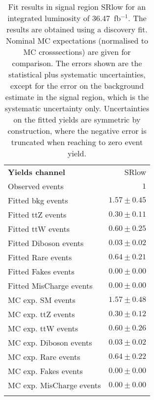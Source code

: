 

\begin{table}
\begin{center}
\setlength{\tabcolsep}{0.0pc}
{\small
\begin{tabular*}{\textwidth}{@{\extracolsep{\fill}}lr}
\noalign{\smallskip}\hline\noalign{\smallskip}
{\bfseries Yields channel}           & SRlow              \\[-0.05cm]
\noalign{\smallskip}\hline\noalign{\smallskip}
Observed events          & $1$                    \\
\noalign{\smallskip}\hline\noalign{\smallskip}
Fitted bkg events         & $1.57 \pm 0.45$              \\
\noalign{\smallskip}\hline\noalign{\smallskip}
        Fitted ttZ events         & $0.30 \pm 0.11$              \\
        Fitted ttW events         & $0.60 \pm 0.25$              \\
        Fitted Diboson events         & $0.03 \pm 0.02$              \\
        Fitted Rare events         & $0.64 \pm 0.21$              \\
        Fitted Fakes events         & $0.00 \pm 0.00$              \\
        Fitted MisCharge events         & $0.00 \pm 0.00$              \\
 \noalign{\smallskip}\hline\noalign{\smallskip}
MC exp. SM events              & $1.57 \pm 0.48$              \\
\noalign{\smallskip}\hline\noalign{\smallskip}
        MC exp. ttZ events         & $0.30 \pm 0.12$              \\
        MC exp. ttW events         & $0.60 \pm 0.26$              \\
        MC exp. Diboson events         & $0.03 \pm 0.02$              \\
        MC exp. Rare events         & $0.64 \pm 0.22$              \\
        MC exp. Fakes events         & $0.00 \pm 0.00$              \\
        MC exp. MisCharge events         & $0.00 \pm 0.00$              \\
\noalign{\smallskip}\hline\noalign{\smallskip}
\end{tabular*}
}
\end{center}
\caption{Fit results in signal region SRlow for an integrated luminosity of 36.47~fb$^{-1}$.
The results are obtained using a discovery fit. Nominal MC expectations (normalised to MC crosssections) are given for comparison. 
The errors shown are the statistical plus systematic uncertainties, except for the error on the background estimate in the signal region, which is the systematic uncertainty only.
Uncertainties on the fitted yields are symmetric by construction, where the negative error is truncated when reaching to zero event yield.
}
\label{table.results.systematics.in.logL.fit..Yields.SRlow}
\end{table}
\clearpage
%
